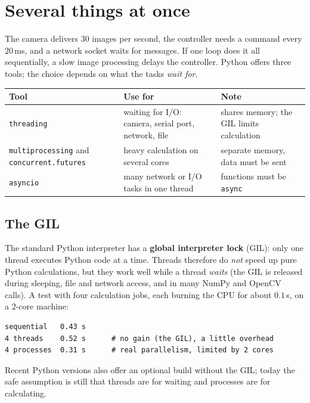 \section*{Several things at once}
The camera delivers $30$ images per second, the controller needs a command every $20$\,ms, and a network socket waits for messages. If one loop does it all sequentially, a slow image processing delays the controller. Python offers three tools; the choice depends on what the tasks \emph{wait for}.
\begin{center}
\renewcommand{\arraystretch}{1.25}
\begin{tabular}{p{3.0cm}p{5.4cm}p{4.6cm}}
\textbf{Tool} & \textbf{Use for} & \textbf{Note}\\ \hline
\texttt{threading} & waiting for I/O: camera, serial port, network, file & shares memory; the GIL limits calculation\\
\texttt{multiprocessing} and \texttt{concurrent.futures} & heavy calculation on several cores & separate memory, data must be sent\\
\texttt{asyncio} & many network or I/O tasks in one thread & functions must be \texttt{async}\\
\end{tabular}
\end{center}

\subsection*{The GIL}
The standard Python interpreter has a \textbf{global interpreter lock} (GIL): only one thread executes Python code at a time. Threads therefore do \emph{not} speed up pure Python calculations, but they work well while a thread \emph{waits} (the GIL is released during sleeping, file and network access, and in many NumPy and OpenCV calls). A test with four calculation jobs, each burning the CPU for about $0.1$\,s, on a $2$-core machine:
\begin{verbatim}
sequential   0.43 s
4 threads    0.52 s      # no gain (the GIL), a little overhead
4 processes  0.31 s      # real parallelism, limited by 2 cores
\end{verbatim}
Recent Python versions also offer an optional build without the GIL; today the safe assumption is still that threads are for waiting and processes are for calculating.

